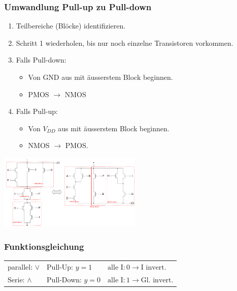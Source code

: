 \subsubsection{Umwandlung Pull-up zu Pull-down}
\begin{enumerate}
    \item Teilbereiche (Blöcke) identifizieren.
    \item Schritt 1 wiederholen, bis nur noch einzelne Transistoren vorkommen. 
    \item Falls Pull-down:
    \begin{itemize}
        \item Von GND aus mit äusserstem Block beginnen.
        \item PMOS $\rightarrow$ NMOS
    \end{itemize}
    \item Falls Pull-up:
    \begin{itemize}
        \item Von $V_{DD}$ aus mit äusserstem Block beginnen.
        \item NMOS $\rightarrow$ PMOS.
    \end{itemize}
\end{enumerate}
\includegraphics[width = 68mm]{images/pnmosconv.png}
\subsubsection{Funktionsgleichung}
\begin{flushleft}
    \small
    \begin{tabular}{l|l l}
        parallel: $\lor$ & Pull-Up: $y=1$ & $\text{alle I}: 0 \rightarrow \text{I invert.}$\\
        Serie: $\land$ & Pull-Down: $y=0$ & $\text{alle I}: 1 \rightarrow \text{Gl. invert.}$\\
    \end{tabular}
\end{flushleft}